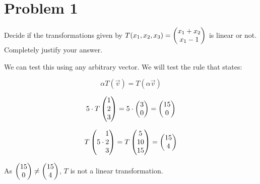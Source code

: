 \section*{Problem 1}

Decide if the transformations given by $T(x_1, x_2, x_3) = \genericmat{p}{x_1 + x_2 \\ x_1 - 1}$ is linear or not. Completely justify your answer.

We can test this using any arbitrary vector. We will test the rule that states:

\[\alpha T(\vec{v}) = T(\alpha \vec{v})\]

\[
	5 \cdot T \genpmat{1\\2\\3} = 5 \cdot \genpmat{3\\0} = \genpmat{15\\0}
\]

\[
	T\left(5 \cdot \genericmat{}{1\\2\\3}\right) = T \genpmat{5\\10\\15} = \genpmat{15\\4}
\]

As $\genpmat{15\\0} \neq \genpmat{15\\4}$, $T$ is not a linear transformation.
